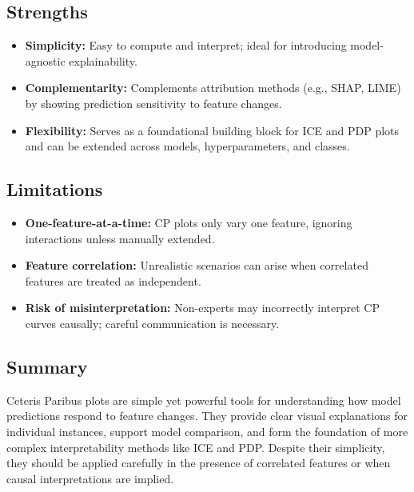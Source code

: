\subsection{Strengths}

\begin{itemize}
    \item \textbf{Simplicity:}  
    Easy to compute and interpret; ideal for introducing model-agnostic explainability.
    \item \textbf{Complementarity:}  
    Complements attribution methods (e.g., SHAP, LIME) by showing prediction sensitivity to feature changes.
    \item \textbf{Flexibility:}  
    Serves as a foundational building block for ICE and PDP plots and can be extended across models, hyperparameters, and classes.
\end{itemize}

\subsection{Limitations}

\begin{itemize}
    \item \textbf{One-feature-at-a-time:}  
    CP plots only vary one feature, ignoring interactions unless manually extended.
    \item \textbf{Feature correlation:}  
    Unrealistic scenarios can arise when correlated features are treated as independent.
    \item \textbf{Risk of misinterpretation:}  
    Non-experts may incorrectly interpret CP curves causally; careful communication is necessary.
\end{itemize}

\subsection{Summary}

Ceteris Paribus plots are simple yet powerful tools for understanding how model predictions respond to feature changes.  
They provide clear visual explanations for individual instances, support model comparison, and form the foundation of more complex interpretability methods like ICE and PDP.  
Despite their simplicity, they should be applied carefully in the presence of correlated features or when causal interpretations are implied.


